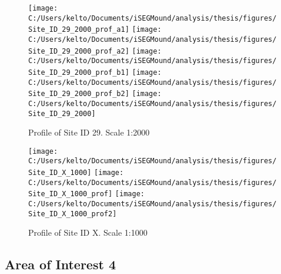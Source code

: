 \documentclass[
  12pt,
]{article}
\begin{document}
\begin{figure}
\texttt{[image: C:/Users/kelto/Documents/iSEGMound/analysis/thesis/figures/Site\_ID\_29\_2000\_prof\_a1]} \texttt{[image: C:/Users/kelto/Documents/iSEGMound/analysis/thesis/figures/Site\_ID\_29\_2000\_prof\_a2]} \texttt{[image: C:/Users/kelto/Documents/iSEGMound/analysis/thesis/figures/Site\_ID\_29\_2000\_prof\_b1]} \texttt{[image: C:/Users/kelto/Documents/iSEGMound/analysis/thesis/figures/Site\_ID\_29\_2000\_prof\_b2]} \texttt{[image: C:/Users/kelto/Documents/iSEGMound/analysis/thesis/figures/Site\_ID\_29\_2000]} \caption{Profile of Site ID 29. Scale 1:2000}\label{fig:FigureAOI3-29}
\end{figure}

\begin{figure}
\texttt{[image: C:/Users/kelto/Documents/iSEGMound/analysis/thesis/figures/Site\_ID\_X\_1000]} \texttt{[image: C:/Users/kelto/Documents/iSEGMound/analysis/thesis/figures/Site\_ID\_X\_1000\_prof]} \texttt{[image: C:/Users/kelto/Documents/iSEGMound/analysis/thesis/figures/Site\_ID\_X\_1000\_prof2]} \caption{Profile of Site ID X. Scale 1:1000}\label{fig:FigureAOI3-X}
\end{figure}

\newpage

\hypertarget{area-of-interest-4}{%
\subsection{Area of Interest 4}\label{area-of-interest-4}}
\end{document}
